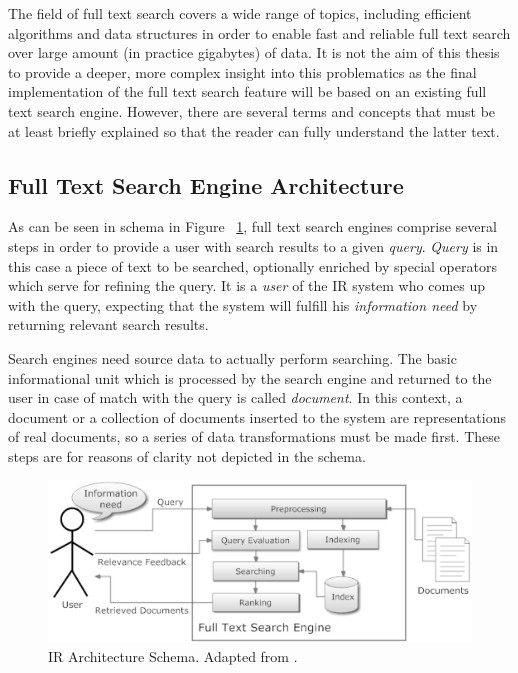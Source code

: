 
The field of full text search covers a wide range of topics, including efficient algorithms and data structures in order to enable fast and reliable full text search over large amount (in practice gigabytes) of data. 
It is not the aim of this thesis to provide a deeper, more complex insight into this problematics as the final implementation of the full text search feature will be based on an existing full text search engine. 
However, there are several terms and concepts that must be at least briefly explained so that the reader can fully understand the latter text.


\subsection{Full Text Search Engine Architecture}

As can be seen in schema in Figure ~\ref{fig:fulltext_schema}, full text search engines comprise several steps in order to provide a user with search results to a given \textsl{query}. 
\textsl{Query} is in this case a piece of text to be searched, optionally enriched by special operators which serve for refining the query. It is a \textsl{user} of the IR system who comes up with the query, expecting that the system will fulfill his \textsl{information need} by returning relevant search results.

Search engines need source data to actually perform searching. The basic informational unit which is processed by the search engine and returned to the user in case of match with the query is called \textsl{document}. In this context, a document or a collection of documents inserted to the system are representations of real documents, so a series of data transformations must be made first. These steps are for reasons of clarity not depicted in the schema.
  
\begin{figure}[h]
	\centering
		\includegraphics[scale=0.63]{figures/fulltext_schema.eps}
	\caption{IR Architecture Schema. Adapted from \cite{IR:ImplemEvalSearchEng}.}
	\label{fig:fulltext_schema}
\end{figure}


